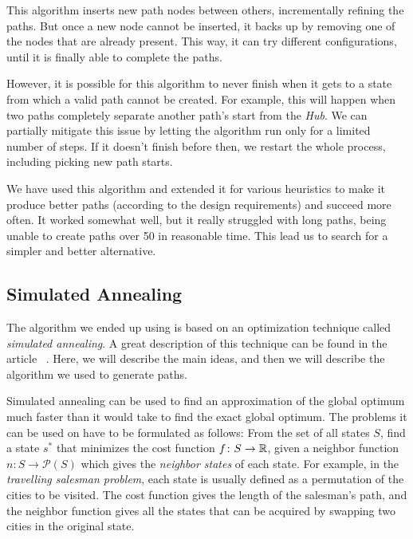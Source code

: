 This algorithm inserts new path nodes between others, incrementally refining the paths.
But once a new node cannot be inserted, it backs up by removing one of the nodes that are already present.
This way, it can try different configurations, until it is finally able to complete the paths.

However, it is possible for this algorithm to never finish when it gets to a state from which a valid path cannot be created.
For example, this will happen when two paths completely separate another path's start from the \emph{Hub}.
We can partially mitigate this issue by letting the algorithm run only for a limited number of steps.
If it doesn't finish before then, we restart the whole process, including picking new path starts.

We have used this algorithm and extended it for various heuristics to make it produce better paths (according to the design requirements) and succeed more often.
It worked somewhat well, but it really struggled with long paths, being unable to create paths over 50 in reasonable time.
This lead us to search for a simpler and better alternative.

\subsection{Simulated Annealing}\label{sec:analysis-simulated-annealing}

The algorithm we ended up using is based on an optimization technique called \emph{simulated annealing}.
A great description of this technique can be found in the article ~\cite{SimulatedAnnealing}.
Here, we will describe the main ideas, and then we will describe the algorithm we used to generate paths.

Simulated annealing can be used to find an approximation of the global optimum much faster than it would take to find the exact global optimum.
The problems it can be used on have to be formulated as follows:
From the set of all states $S$, find a state $s^*$ that minimizes the cost function $f \colon S \to \mathbb{R}$, given a neighbor function $n \colon S \to \mathcal{P}(S)$ which gives the \emph{neighbor states} of each state.
For example, in the \emph{travelling salesman problem}, each state is usually defined as a permutation of the cities to be visited.
The cost function gives the length of the salesman's path, and the neighbor function gives all the states that can be acquired by swapping two cities in the original state.

